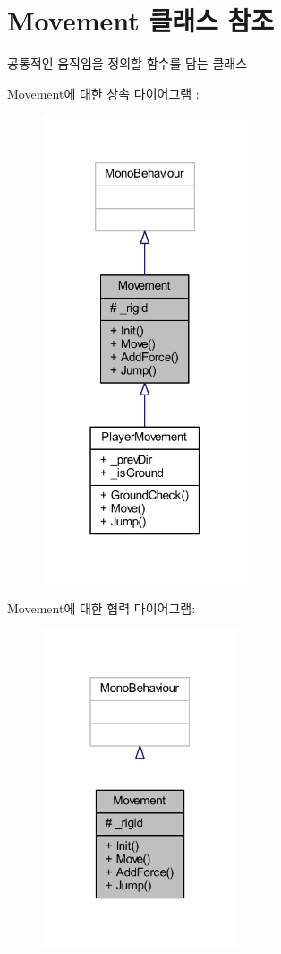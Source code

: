 \hypertarget{class_movement}{}\section{Movement 클래스 참조}
\label{class_movement}


공통적인 움직임을 정의할 함수를 담는 클래스  




Movement에 대한 상속 다이어그램 \+: 
\nopagebreak
\begin{figure}[H]
\begin{center}
\leavevmode
\includegraphics[width=171pt]{d8/d54/class_movement__inherit__graph}
\end{center}
\end{figure}


Movement에 대한 협력 다이어그램\+:
\nopagebreak
\begin{figure}[H]
\begin{center}
\leavevmode
\includegraphics[width=163pt]{d6/dad/class_movement__coll__graph}
\end{center}
\end{figure}
